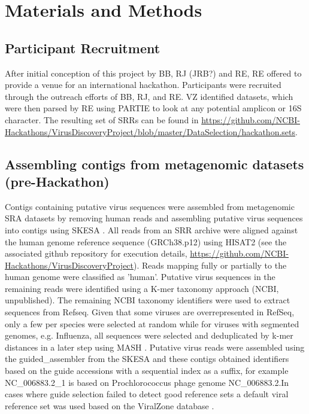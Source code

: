 \section{Materials and Methods}

  \subsection{Participant Recruitment}
  After initial conception of this project by BB, RJ (JRB?) and RE, RE offered
  to provide a venue for an international hackathon.  Participants were
  recruited through the outreach efforts of BB, RJ, and RE.  VZ identified
  datasets, which were then parsed by RE using PARTIE \cite{Torres2017} to look
  at any potential amplicon or 16S character.  The resulting set of SRRs can be
  found in \url{https://github.com/NCBI-Hackathons/VirusDiscoveryProject/blob/master/DataSelection/hackathon.sets}.

  \subsection{Assembling contigs from metagenomic datasets (pre-Hackathon)}
  Contigs containing putative virus sequences were assembled from metagenomic
  SRA datasets by removing human reads and assembling putative virus sequences
  into contigs using SKESA \cite{Souvorov2018}. All reads from an SRR archive
  were aligned against the human genome reference sequence (GRCh38.p12) using
  HISAT2 \cite{Kim2015} (see the associated github repository for execution
  details, \url{https://github.com/NCBI-Hackathons/VirusDiscoveryProject}).
  Reads mapping fully or partially  to the human genome were  classified as
  'human'. Putative virus sequences in the remaining reads were identified
  using a K-mer taxonomy approach (NCBI, unpublished). The remaining NCBI
  taxonomy identifiers were used to extract sequences from Refseq. Given that
  some viruses are overrepresented in RefSeq,  only a few per species were
  selected at random while for viruses with segmented genomes, e.g. Influenza,
  all sequences were selected and deduplicated by k-mer distances in a later
  step using MASH \cite{Ondov2019}. Putative virus reads were assembled using
  the guided\_assembler from the SKESA and these contigs obtained identifiers
  based on the guide accessions with a sequential index as a suffix, for
  example NC\_006883.2\_1 is based on Prochlorococcus phage genome
  NC\_006883.2.In cases where guide selection failed to detect good reference
  sets a default viral reference set was used based on the ViralZone database
  \cite{Hulo2011}.


